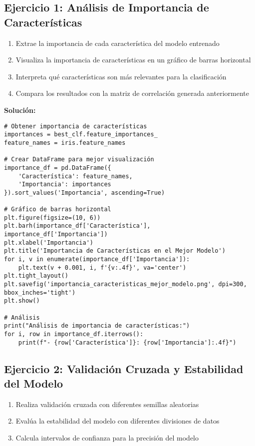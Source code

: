 \documentclass[12pt]{article}
\begin{document}
\subsection{Ejercicio 1: Análisis de Importancia de Características}
\begin{enumerate}
    \item Extrae la importancia de cada característica del modelo entrenado
    \item Visualiza la importancia de características en un gráfico de barras horizontal
    \item Interpreta qué características son más relevantes para la clasificación
    \item Compara los resultados con la matriz de correlación generada anteriormente
\end{enumerate}

\textbf{Solución:}
\begin{lstlisting}
# Obtener importancia de características
importances = best_clf.feature_importances_
feature_names = iris.feature_names

# Crear DataFrame para mejor visualización
importance_df = pd.DataFrame({
    'Característica': feature_names,
    'Importancia': importances
}).sort_values('Importancia', ascending=True)

# Gráfico de barras horizontal
plt.figure(figsize=(10, 6))
plt.barh(importance_df['Característica'], importance_df['Importancia'])
plt.xlabel('Importancia')
plt.title('Importancia de Características en el Mejor Modelo')
for i, v in enumerate(importance_df['Importancia']):
    plt.text(v + 0.001, i, f'{v:.4f}', va='center')
plt.tight_layout()
plt.savefig('importancia_caracteristicas_mejor_modelo.png', dpi=300, bbox_inches='tight')
plt.show()

# Análisis
print("Análisis de importancia de características:")
for i, row in importance_df.iterrows():
    print(f"- {row['Característica']}: {row['Importancia']:.4f}")
\end{lstlisting}

\subsection{Ejercicio 2: Validación Cruzada y Estabilidad del Modelo}
\begin{enumerate}
    \item Realiza validación cruzada con diferentes semillas aleatorias
    \item Evalúa la estabilidad del modelo con diferentes divisiones de datos
    \item Calcula intervalos de confianza para la precisión del modelo
\end{enumerate}
\end{document}
